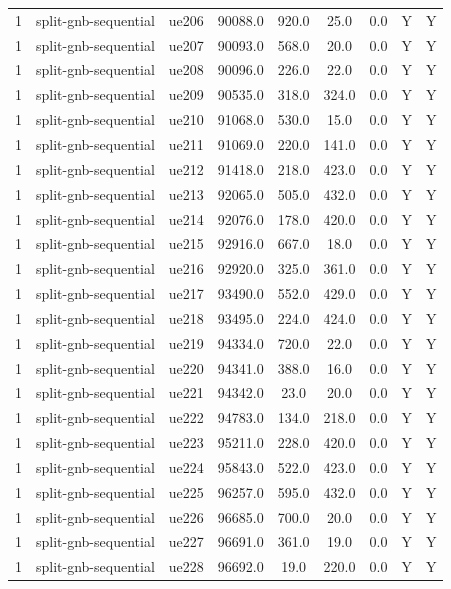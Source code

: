\begin{table}[ht]
\begin{tabular}{|c|c|c|c|c|c|c|c|c|}
1 & split-gnb-sequential & ue206 & 90088.0 & 920.0 & 25.0 & 0.0 & Y & Y \\
1 & split-gnb-sequential & ue207 & 90093.0 & 568.0 & 20.0 & 0.0 & Y & Y \\
1 & split-gnb-sequential & ue208 & 90096.0 & 226.0 & 22.0 & 0.0 & Y & Y \\
1 & split-gnb-sequential & ue209 & 90535.0 & 318.0 & 324.0 & 0.0 & Y & Y \\
1 & split-gnb-sequential & ue210 & 91068.0 & 530.0 & 15.0 & 0.0 & Y & Y \\
1 & split-gnb-sequential & ue211 & 91069.0 & 220.0 & 141.0 & 0.0 & Y & Y \\
1 & split-gnb-sequential & ue212 & 91418.0 & 218.0 & 423.0 & 0.0 & Y & Y \\
1 & split-gnb-sequential & ue213 & 92065.0 & 505.0 & 432.0 & 0.0 & Y & Y \\
1 & split-gnb-sequential & ue214 & 92076.0 & 178.0 & 420.0 & 0.0 & Y & Y \\
1 & split-gnb-sequential & ue215 & 92916.0 & 667.0 & 18.0 & 0.0 & Y & Y \\
1 & split-gnb-sequential & ue216 & 92920.0 & 325.0 & 361.0 & 0.0 & Y & Y \\
1 & split-gnb-sequential & ue217 & 93490.0 & 552.0 & 429.0 & 0.0 & Y & Y \\
1 & split-gnb-sequential & ue218 & 93495.0 & 224.0 & 424.0 & 0.0 & Y & Y \\
1 & split-gnb-sequential & ue219 & 94334.0 & 720.0 & 22.0 & 0.0 & Y & Y \\
1 & split-gnb-sequential & ue220 & 94341.0 & 388.0 & 16.0 & 0.0 & Y & Y \\
1 & split-gnb-sequential & ue221 & 94342.0 & 23.0 & 20.0 & 0.0 & Y & Y \\
1 & split-gnb-sequential & ue222 & 94783.0 & 134.0 & 218.0 & 0.0 & Y & Y \\
1 & split-gnb-sequential & ue223 & 95211.0 & 228.0 & 420.0 & 0.0 & Y & Y \\
1 & split-gnb-sequential & ue224 & 95843.0 & 522.0 & 423.0 & 0.0 & Y & Y \\
1 & split-gnb-sequential & ue225 & 96257.0 & 595.0 & 432.0 & 0.0 & Y & Y \\
1 & split-gnb-sequential & ue226 & 96685.0 & 700.0 & 20.0 & 0.0 & Y & Y \\
1 & split-gnb-sequential & ue227 & 96691.0 & 361.0 & 19.0 & 0.0 & Y & Y \\
1 & split-gnb-sequential & ue228 & 96692.0 & 19.0 & 220.0 & 0.0 & Y & Y \\

\end{tabular}
\end{table}
